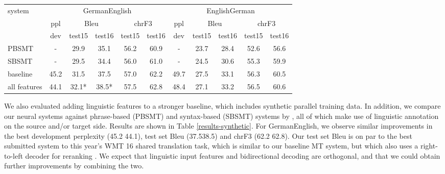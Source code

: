 \documentclass[11pt]{article}
\begin{document}
\begin{table*}
\centering
\small
\begin{tabular}{l|c|cc|cc||c|cc|cc}
\multirow{3}{*}{system} & \multicolumn{5}{c||}{GermanEnglish} & \multicolumn{5}{c}{EnglishGerman}\\
& ppl  & \multicolumn{2}{c|}{{\sc Bleu} } & \multicolumn{2}{c||}{{\sc chrF3} } & ppl  & \multicolumn{2}{c|}{{\sc Bleu} } & \multicolumn{2}{c}{{\sc chrF3} }\\
& dev & test15 & test16  & test15 & test16 & dev & test15 & test16  & test15 & test16\\
\hline
PBSMT \cite{williams2016} & - & 29.9\phantom{*} & 35.1\phantom{*} & 56.2 & 60.9 & - & 23.7\phantom{*} & 28.4\phantom{*} & 52.6 & 56.6 \\ SBSMT \cite{williams2016} & - & 29.5\phantom{*} & 34.4\phantom{*} & 56.0 & 61.0 & - & 24.5\phantom{*} & 30.6\phantom{*} & 55.3 & 59.9 \\ \hline
baseline & 45.2 & 31.5\phantom{*} & 37.5\phantom{*} & 57.0 & 62.2 & 49.7 & 27.5\phantom{*} & 33.1\phantom{*} & 56.3 & 60.5\\ all features & 44.1 & 32.1* & 38.5* & 57.5 & 62.8 & 48.4 & 27.1\phantom{*} & 33.2\phantom{*} & 56.5 & 60.6 \\ \end{tabular}
\caption{GermanEnglish translation results with additional, synthetic training data: best perplexity on dev (newstest2013), and {\sc Bleu} and {\sc chrF3} on test15 (newstest2015) and test16 (newstest2016). {\sc Bleu} scores that are significantly different (p < 0.05) from respective baseline are marked with (*).}
\label{results-synthetic}
\end{table*}

We also evaluated adding linguistic features to a stronger baseline, which includes synthetic parallel training data.
In addition, we compare our neural systems against phrase-based (PBSMT) and syntax-based (SBSMT) systems by \cite{williams2016}, all of which make use of linguistic annotation on the source and/or target side.
Results are shown in Table \ref{results-synthetic}.
For GermanEnglish, we observe similar improvements in the best development perplexity (45.2  44.1), test set {\sc Bleu} (37.538.5) and {\sc chrF3} (62.2  62.8).
Our test set {\sc Bleu} is on par to the best submitted system to this year's WMT 16 shared translation task, which is similar to our baseline MT system, but which also uses a right-to-left decoder for reranking \cite{sennrich-wmt16}.
We expect that linguistic input features and bidirectional decoding are orthogonal, and that we could obtain further improvements by combining the two.
\end{document}
